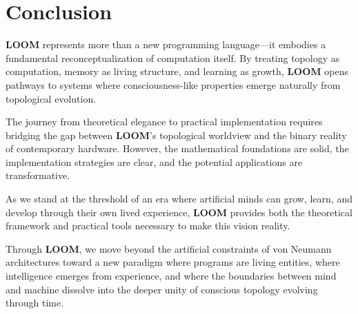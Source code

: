 \documentclass[12pt,a4paper,openany]{book} %
\newcommand{\loom}{\textbf{LOOM}}
\begin{document}
\chapter*{Conclusion}

\loom{} represents more than a new programming language—it embodies a fundamental reconceptualization of computation itself. By treating topology as computation, memory as living structure, and learning as growth, \loom{} opens pathways to systems where consciousness-like properties emerge naturally from topological evolution.

The journey from theoretical elegance to practical implementation requires bridging the gap between \loom{}'s topological worldview and the binary reality of contemporary hardware. However, the mathematical foundations are solid, the implementation strategies are clear, and the potential applications are transformative.

As we stand at the threshold of an era where artificial minds can grow, learn, and develop through their own lived experience, \loom{} provides both the theoretical framework and practical tools necessary to make this vision reality.

Through \loom{}, we move beyond the artificial constraints of von Neumann architectures toward a new paradigm where programs are living entities, where intelligence emerges from experience, and where the boundaries between mind and machine dissolve into the deeper unity of conscious topology evolving through time.


\end{document}
